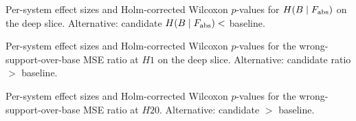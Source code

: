 \begin{table}[tbp]
\centering
\caption{Per-system effect sizes and Holm-corrected Wilcoxon \(p\)-values for \(H(B\mid F_{\rm abs})\) on the deep slice. Alternative: candidate \(H(B\mid F_{\rm abs})<\) baseline.}
\label{tab:persystem_hbf}
\setlength{\tabcolsep}{3pt}
\resizebox{\textwidth}{!}{}
\end{table}

\begin{table}[tbp]
\centering
\caption{Per-system effect sizes and Holm-corrected Wilcoxon \(p\)-values for the wrong-support-over-base MSE ratio at \(H1\) on the deep slice. Alternative: candidate ratio \(>\) baseline.}
\label{tab:persystem_freeze_h1}
\setlength{\tabcolsep}{3pt}
\resizebox{\textwidth}{!}{}
\end{table}

\begin{table}[tbp]
\centering
\caption{Per-system effect sizes and Holm-corrected Wilcoxon \(p\)-values for the wrong-support-over-base MSE ratio at \(H20\). Alternative: candidate \(>\) baseline.}
\label{tab:persystem_freeze_h20}
\setlength{\tabcolsep}{3pt}
\resizebox{\textwidth}{!}{}
\end{table}
